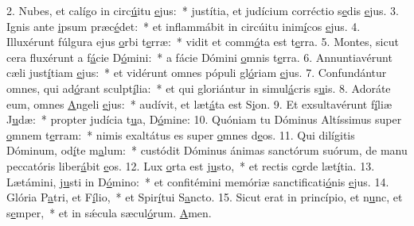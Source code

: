 2. Nubes, et calígo in circ\uline{ú}itu \uline{e}jus:~* justítia, et judícium corréctio s\uline{e}dis \uline{e}jus.
3. Ignis ante \uline{i}psum præc\uline{é}det:~* et inflammábit in circúitu inim\uline{í}cos \uline{e}jus.
4. Illuxérunt fúlgura ejus \uline{o}rbi t\uline{e}rræ:~* vidit et comm\uline{ó}ta est t\uline{e}rra.
5. Montes, sicut cera fluxérunt a f\uline{á}cie D\uline{ó}mini:~* a fácie Dómini \uline{o}mnis t\uline{e}rra.
6. Annuntiavérunt cæli just\uline{í}tiam \uline{e}jus:~* et vidérunt omnes pópuli gl\uline{ó}riam \uline{e}jus.
7. Confundántur omnes, qui ad\uline{ó}rant sculpt\uline{í}lia:~* et qui gloriántur in simul\uline{á}cris s\uline{u}is.
8. Adoráte eum, omnes \uline{A}ngeli \uline{e}jus:~* audívit, et læt\uline{á}ta est S\uline{i}on.
9. Et exsultavérunt f\uline{í}liæ J\uline{u}dæ:~* propter judícia t\uline{u}a, D\uline{ó}mine:
10. Quóniam tu Dóminus Altíssimus super \uline{o}mnem t\uline{e}rram:~* nimis exaltátus es super \uline{o}mnes d\uline{e}os.
11. Qui dilígitis Dóminum, od\uline{í}te m\uline{a}lum:~* custódit Dóminus ánimas sanctórum suórum, de manu peccatóris liber\uline{á}bit \uline{e}os.
12. Lux \uline{o}rta est j\uline{u}sto,~* et rectis c\uline{o}rde læt\uline{í}tia.
13. Lætámini, j\uline{u}sti in D\uline{ó}mino:~* et confitémini memóriæ sanctificati\uline{ó}nis \uline{e}jus.
14. Glória P\uline{a}tri, et F\uline{í}lio,~* et Spir\uline{í}tui S\uline{a}ncto.
15. Sicut erat in princípio, et n\uline{u}nc, et s\uline{e}mper,~* et in sǽcula sæcul\uline{ó}rum. \uline{A}men.
